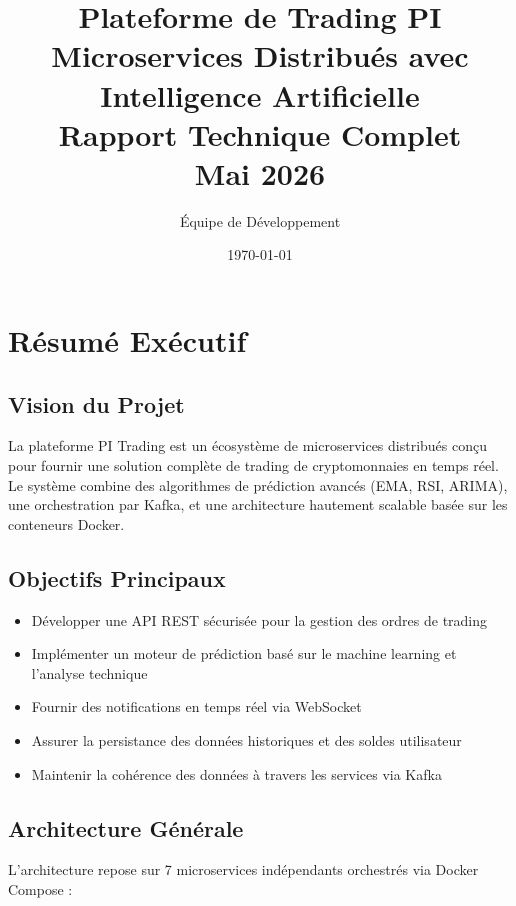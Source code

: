 \documentclass[12pt,a4paper,twoside]{report}
\title{
    \textbf{Plateforme de Trading PI} \\
    \large Microservices Distribués avec Intelligence Artificielle \\
    \normalsize Rapport Technique Complet \\
    \vspace{0.5cm}
    \normalsize Mai 2026
}
\author{Équipe de Développement}
\date{\today}
\begin{document}
\maketitle

\tableofcontents
\newpage

\chapter{Résumé Exécutif}

\section{Vision du Projet}
La plateforme PI Trading est un écosystème de microservices distribués conçu pour fournir une solution complète de trading de cryptomonnaies en temps réel. Le système combine des algorithmes de prédiction avancés (EMA, RSI, ARIMA), une orchestration par Kafka, et une architecture hautement scalable basée sur les conteneurs Docker.

\section{Objectifs Principaux}
\begin{itemize}
    \item Développer une API REST sécurisée pour la gestion des ordres de trading
    \item Implémenter un moteur de prédiction basé sur le machine learning et l'analyse technique
    \item Fournir des notifications en temps réel via WebSocket
    \item Assurer la persistance des données historiques et des soldes utilisateur
    \item Maintenir la cohérence des données à travers les services via Kafka
\end{itemize}

\section{Architecture Générale}
L'architecture repose sur 7 microservices indépendants orchestrés via Docker Compose :
\end{document}
